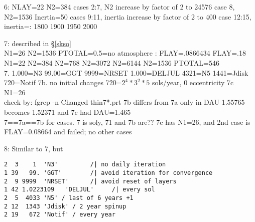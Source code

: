\documentclass{article}  %
\begin{document}
6: NLAY=22 N2=384
\qi cases 2:7, N2 increase by factor of 2 to  24576
\qi case 8, N2=1536 Inertia=50
\qi cases 9:11, inertia increase by factor of 2 to 400
\qi case 12:15, inertia=: 1800 1900 1950 2000

7: described in \S \ref{skso}
\\ N1=26 N2=1536  PTOTAL=0.5=no atmosphere
: FLAY=.0866434
\qi FLAY=.18 N1=22
\qi N2=384
\qi N2=768
\qi N2=3072
\qi N2=6144
\qi N2=1536 PTOTAL=546
\\ 7.  1.000=N3  99.00=GGT  9999=NRSET  1.000=DELJUL  4321=N5  1441=Jdisk  720=Notif 
\qi 7b. no initial changes   720=$2^4*3^2*5$ sols/year, 0 eccentricity
\qi 7c N1=26
\\ check by: fgrep -n Changed thin7*.prt
\qi 7b differs from 7a only in  DAU 1.55765 becomes 1.52371 
 and 7c had DAU=1.465
\\ 7==7a==7b  for cases.   7 is soly, 71 and 7b are??
\qi 7c has N1=26, and 2nd case is  FLAY=0.08664 and failed; no other cases

8: Similar to 7, but 
\vspace{-3.mm} 
\begin{verbatim}
2  3    1  'N3'         /| no daily iteration
1 39   99. 'GGT'        /| avoid iteration for convergence
2  9 9999  'NRSET'      /| avoid reset of layers
1 42 1.0223109   'DELJUL'     /| every sol
2  5  4033 'N5' / last of 6 years +1
2 12  1343 'Jdisk' / 2 year spinup
2 19   672 'Notif' / every year
\end{verbatim} 

\end{document}

